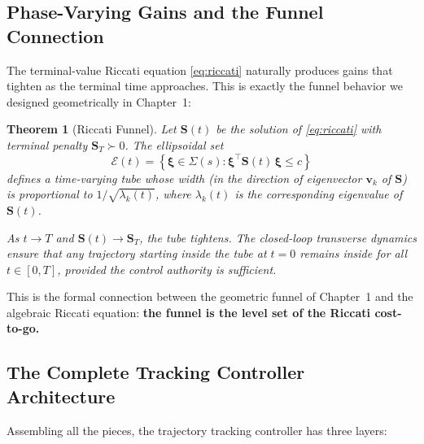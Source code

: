 \documentclass[12pt, openany]{book}
\theoremstyle{plain}
\newtheorem{theorem}{Theorem}[chapter]
\begin{document}
\subsection{Phase-Varying Gains and the Funnel Connection}

The terminal-value Riccati equation \eqref{eq:riccati} naturally produces
gains that tighten as the terminal time approaches. This is exactly the
funnel behavior we designed geometrically in Chapter~1:

\begin{theorem}[Riccati Funnel]\label{thm:riccati_funnel}
  Let $\bm{S}(t)$ be the solution of \eqref{eq:riccati} with terminal
  penalty $\bm{S}_T \succ 0$. The ellipsoidal set
  \begin{equation}
    \mathcal{E}(t) = \left\{\bm{\xi} \in \Sigma(s) :
    \bm{\xi}^\top \bm{S}(t)\, \bm{\xi} \leq c \right\}
  \end{equation}
  defines a time-varying tube whose width (in the direction of eigenvector
  $\bm{v}_k$ of $\bm{S}$) is proportional to $1/\sqrt{\lambda_k(t)}$, where
  $\lambda_k(t)$ is the corresponding eigenvalue of $\bm{S}(t)$.

  As $t \to T$ and $\bm{S}(t) \to \bm{S}_T$, the tube tightens. The
  closed-loop transverse dynamics ensure that any trajectory starting inside
  the tube at $t = 0$ remains inside for all $t \in [0, T]$, provided the
  control authority is sufficient.
\end{theorem}

This is the formal connection between the geometric funnel of Chapter~1 and
the algebraic Riccati equation: \textbf{the funnel is the level set of the
Riccati cost-to-go.}

\subsection{The Complete Tracking Controller Architecture}

Assembling all the pieces, the trajectory tracking controller has three
layers:
\end{document}
